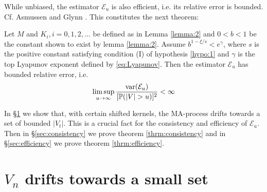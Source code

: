 While unbiased, the estimator $\mathcal E_u$ is also efficient,
i.e. its relative error is bounded. Cf. Asmussen and Glynn
\cite{opac-b1123521}. This constitutes the next theorem:
\begin{theorem}
  \label{thrm:efficiency}
  Let $M$ and $K_i, i=0, 1, 2, \dots$ be defined as in Lemma
  \ref{lemma:2} and $0 < b <1$ be the constant shown to exist by lemma
  \ref{lemma:2}.
  Assume $b^{1- \xi/s} < e^\gamma$, where $s$ is the
  positive constant satisfying condition (I) of hypothesis
  \ref{hypo:1} and $\gamma$ is the top 
  Lyapunov exponent defined by \eqref{eq:Lyapunov}.
  Then the estimator $\mathcal E_u$ has bounded relative error, i.e.
  \begin{equation*}
    \limsup_{u \to \infty} {\text{var}(\mathcal E_u) \over [\mathbb{P}(|V| > u)]^2} < \infty
  \end{equation*}
\end{theorem}
In \S\ref{sec:drift} we show that, with certain shifted kernels, the
MA-process drifts towards a set of bounded $|V_t|$. This is a crucial
fact for the consistency and efficiency of $\mathcal E_u$.
Then in \S\ref{sec:consistency} we prove theorem
\ref{thrm:consistency} and in \S\ref{sec:efficiency} we prove theorem
\ref{thrm:efficiency}.

\section[The chain drifts towards a small set]{$V_n$ drifts towards a small set}
\label{sec:drift}

